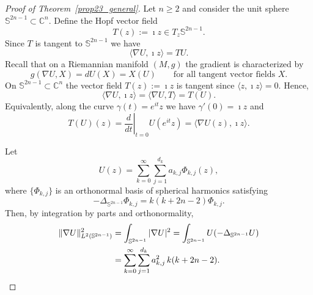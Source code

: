 \documentclass[11pt]{amsart}
\numberwithin{equation}{section}
\def\ge{\geqslant}
\begin{document}
\begin{proof}[Proof of Theorem~\ref{prop23_general}]
Let $n\ge 2$ and consider the unit sphere $\mathbb S^{2n-1}\subset \mathbb C^n$.
Define the Hopf vector field
\[
T(z):=\imath z\in T_z\mathbb S^{2n-1}.
\]
Since $T$ is tangent to $\mathbb S^{2n-1}$ we have
\[
\langle \nabla U, \imath z\rangle = TU .
\]
Recall that on a Riemannian manifold $(M,g)$ the gradient is characterized by
\[
g(\nabla U,X)=dU(X)=X(U)
\qquad \text{for all tangent vector fields }X.
\]
On $\mathbb S^{2n-1}\subset\mathbb C^n$ the vector field $T(z):=\imath z$ is tangent
since $\langle z,\imath z\rangle=0$. Hence,
\[
\langle \nabla U,\imath z\rangle=\langle \nabla U,T\rangle =T(U).
\]
Equivalently, along the curve $\gamma(t)=e^{it}z$ we have $\gamma'(0)=\imath z$ and
\[
T(U)(z)=\left.\frac{d}{dt}\right|_{t=0}U(e^{it}z)
=\langle \nabla U(z),\imath z\rangle .
\]

Let
\[
U(z)=\sum_{k=0}^\infty\sum_{j=1}^{d_k} a_{k,j}\Phi_{k,j}(z),
\]
where $\{\Phi_{k,j}\}$ is an orthonormal basis of spherical harmonics satisfying
\[
-\Delta_{\mathbb S^{2n-1}}\Phi_{k,j}=k(k+2n-2)\Phi_{k,j}.
\]
Then, by integration by parts and orthonormality,
\begin{align}
\|\nabla U\|_{L^2(\mathbb S^{2n-1})}^2
&=\int_{\mathbb S^{2n-1}} |\nabla U|^2
=\int_{\mathbb S^{2n-1}} U(-\Delta_{\mathbb S^{2n-1}}U) \notag\\
&=\sum_{k=0}^\infty\sum_{j=1}^{d_k} a_{k,j}^2\,k(k+2n-2).
\label{eq:grad_energy_general}
\end{align}


\end{proof}
\end{document}
